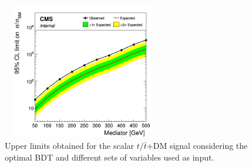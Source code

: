 \documentclass[a4paper, 10pt, openright]{report}
\begin{document}
\begin{appendices}
\begin{figure}[htbp]
{\begin{minipage}[b]{.48\textwidth}
\includegraphics[width=7cm, height=6cm]{figs/limit_ttDM_scalar__set4_BDT.png}
\end{minipage} \hfill
}
\caption{Upper limits obtained for the scalar $t/\bar t$+DM signal considering the optimal \ac{BDT} and different sets of variables used as input.}
\label{fig:optVarBDT}
\end{figure}


\end{appendices}
\end{document}
